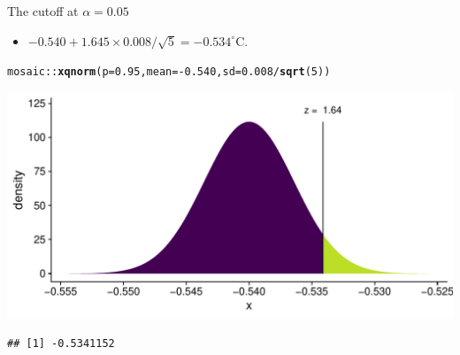 \documentclass[10pt,handout]{beamer}\usepackage[]{graphicx}\usepackage[]{color}
\makeatletter
\def\maxwidth{ %
  \ifdim\Gin@nat@width>\linewidth
    \linewidth
  \else
    \Gin@nat@width
  \fi
}
\newcommand{\hlnum}[1]{\textcolor[rgb]{0.686,0.059,0.569}{#1}}%
\newcommand{\hlopt}[1]{\textcolor[rgb]{0,0,0}{#1}}%
\newcommand{\hlstd}[1]{\textcolor[rgb]{0.345,0.345,0.345}{#1}}%
\newcommand{\hlkwc}[1]{\textcolor[rgb]{0.333,0.667,0.333}{#1}}%
\newcommand{\hlkwd}[1]{\textcolor[rgb]{0.737,0.353,0.396}{\textbf{#1}}}%
\newenvironment{kframe}{%
 \def\at@end@of@kframe{}%
 \ifinner\ifhmode%
  \def\at@end@of@kframe{\end{minipage}}%
  \begin{minipage}{\columnwidth}%
 \fi\fi%
 \def\FrameCommand##1{\hskip\@totalleftmargin \hskip-\fboxsep
 \colorbox{shadecolor}{##1}\hskip-\fboxsep
     \hskip-\linewidth \hskip-\@totalleftmargin \hskip\columnwidth}%
 \MakeFramed {\advance\hsize-\width
   \@totalleftmargin\z@ \linewidth\hsize
   \@setminipage}}%
 {\par\unskip\endMakeFramed%
 \at@end@of@kframe}
\newenvironment{knitrout}{}{} %
\makeatother
\begin{document}
\begin{frame}[fragile]{The cutoff at $\alpha = 0.05$}
	\begin{itemize}
		\item $-0.540 + 1.645 \times 0.008/\sqrt{5}  = -0.534^{\circ}\textrm{C}.$
	\end{itemize}
	
\begin{knitrout}\tiny
{}\color{fgcolor}\begin{kframe}
\begin{alltt}
\hlstd{mosaic}\hlopt{::}\hlkwd{xqnorm}\hlstd{(}\hlkwc{p} \hlstd{=} \hlnum{0.95}\hlstd{,} \hlkwc{mean} \hlstd{=} \hlopt{-}\hlnum{0.540}\hlstd{,} \hlkwc{sd} \hlstd{=} \hlnum{0.008}\hlopt{/}\hlkwd{sqrt}\hlstd{(}\hlnum{5}\hlstd{))}
\end{alltt}
\end{kframe}

{\centering \includegraphics[width=\maxwidth]{figure/unnamed-chunk-7-1} 

}


\begin{kframe}\begin{verbatim}
## [1] -0.5341152
\end{verbatim}
\end{kframe}
\end{knitrout}
\end{frame}
\end{document}
